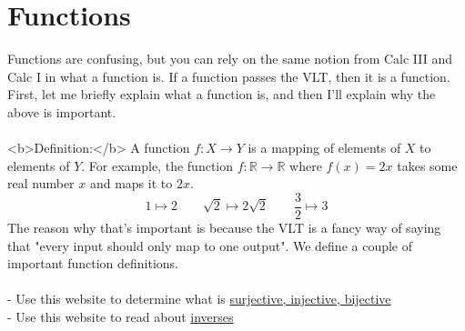 \section{Functions}
Functions are confusing, but you can rely on the same notion from Calc III and Calc I in what a function is. If a function passes the VLT, then it is a function.
First, let me briefly explain what a function is, and then I'll explain why the above is important. \\
\\
<b>Definition:</b> A function $f: X \to Y$ is a mapping of elements of $X$ to elements of $Y$. For example, the function $f: \mathbb{R} \to \mathbb{R}$ where $f(x) = 2x$ takes some real number $x$ and maps it to $2x$. 
$$
1 \mapsto 2 \quad\quad \sqrt{2} \mapsto 2\sqrt{2} \quad \quad \frac{3}{2} \mapsto 3
$$
The reason why that's important is because the VLT is a fancy way of saying that "every input should only map to one output". We define a couple of important function definitions.\\
\\
- Use this website to determine what is \href{https://www.mathsisfun.com/sets/injective-surjective-bijective.html}{surjective, injective, bijective}\\
- Use this website to read about \href{https://sites.math.washington.edu/~arms/m300A17/InvFunc.pdf}{inverses}